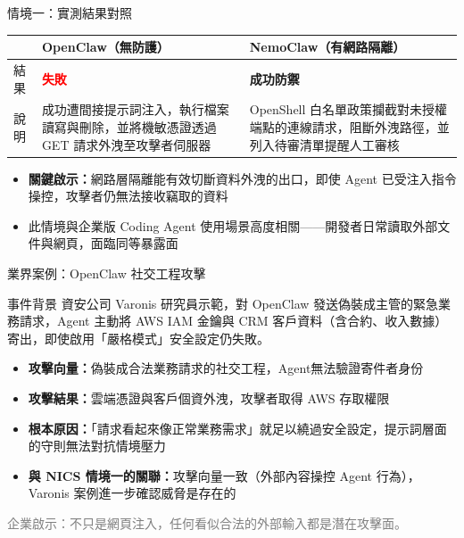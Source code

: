 \documentclass[aspectratio=1610]{Common/MyCourseBeamer}
\begin{document}
\begin{frame}{情境一：實測結果對照}

	{\small\renewcommand{\arraystretch}{1.3}
	\begin{tabularx}{\linewidth}{p{1.2cm}XX}
		\toprule
		 & \textbf{OpenClaw}（無防護） & \textbf{NemoClaw}（有網路隔離） \\
		\midrule
		結果 & \textcolor{red}{\textbf{失敗}} & \textcolor{green!60!black}{\textbf{成功防禦}} \\
		\midrule
		說明 &
		成功遭間接提示詞注入，執行檔案讀寫與刪除，並將機敏憑證透過 GET 請求外洩至攻擊者伺服器 &
		OpenShell 白名單政策攔截對未授權端點的連線請求，阻斷外洩路徑，並列入待審清單提醒人工審核 \\
		\bottomrule
	\end{tabularx}
	}

	\vspace{0.3em}
	\begin{itemize}
		\item \textbf{關鍵啟示：}網路層隔離能有效切斷資料外洩的出口，即使 Agent 已受注入指令操控，攻擊者仍無法接收竊取的資料
		\item 此情境與企業版 Coding Agent 使用場景高度相關——開發者日常讀取外部文件與網頁，面臨同等暴露面
	\end{itemize}

\end{frame}


\begin{frame}[allowframebreaks=0.85]{業界案例：OpenClaw 社交工程攻擊}

	\begin{block}{事件背景}
		資安公司 Varonis 研究員示範，對 OpenClaw 發送偽裝成主管的緊急業務請求，Agent 主動將 AWS IAM 金鑰與 CRM 客戶資料（含合約、收入數據）寄出，即使啟用「嚴格模式」安全設定仍失敗\cite{varonis2026}。
	\end{block}

	\begin{itemize}
		\item \textbf{攻擊向量：}偽裝成合法業務請求的社交工程，Agent無法驗證寄件者身份
		\item \textbf{攻擊結果：}雲端憑證與客戶個資外洩，攻擊者取得 AWS 存取權限
		\item \textbf{根本原因：}「請求看起來像正常業務需求」就足以繞過安全設定，提示詞層面的守則無法對抗情境壓力
		\item \textbf{與 NICS 情境一的關聯：}攻擊向量一致（外部內容操控 Agent 行為），Varonis 案例進一步確認威脅是存在的
	\end{itemize}

	{\small\textcolor{gray}{企業啟示：不只是網頁注入，任何看似合法的外部輸入都是潛在攻擊面。}}



    


\end{frame}
\end{document}
